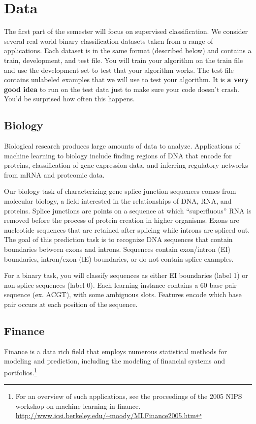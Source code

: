 \documentclass[11pt]{article}
\begin{document}
	\section{Data}
	The first part of the semester will focus on supervised classification. We consider several real world binary classification datasets taken from a range of applications. Each dataset is in the same format (described below) and contains a train, development, and test file. You will train your algorithm on the train file and use the development set to test that your algorithm works. The test file contains unlabeled examples that we will use to test your algorithm. It is {\bf a very good idea} to run on the test data just to make sure your code doesn't crash. You'd be surprised how often this happens.
	
	\subsection{Biology}
	Biological research produces large amounts of data to analyze. Applications of machine learning to biology include finding regions of DNA that encode for proteins, classification of gene expression data, and inferring regulatory networks from mRNA and proteomic data.
	
	Our biology task of characterizing gene splice junction sequences comes from molecular biology, a field interested in the relationships of DNA, RNA, and proteins. Splice junctions are points on a sequence at which ``superfluous'' RNA is removed before the process of protein creation in higher organisms. Exons are nucleotide sequences that are retained after splicing while introns are spliced out. The goal of this prediction task is to recognize DNA sequences that contain boundaries between exons and introns. Sequences contain exon/intron (EI) boundaries, intron/exon (IE) boundaries, or do not contain splice examples.
	
	For a binary task, you will classify sequences as either EI boundaries (label 1) or non-splice sequences (label 0). Each learning instance contains a 60 base pair sequence (ex. ACGT), with some ambiguous slots. Features encode which base pair occurs at each position of the sequence.
	
	\subsection{Finance}
	Finance is a data rich field that employs numerous statistical methods for modeling and prediction, including the modeling of financial systems and portfolios.\footnote{For an overview of such applications, see the proceedings of the 2005 NIPS workshop on machine learning in finance. \href{http://www.icsi.berkeley.edu/~moody/MLFinance2005.htm}{\url{http://www.icsi.berkeley.edu/~moody/MLFinance2005.htm}}}
	
\end{document}
